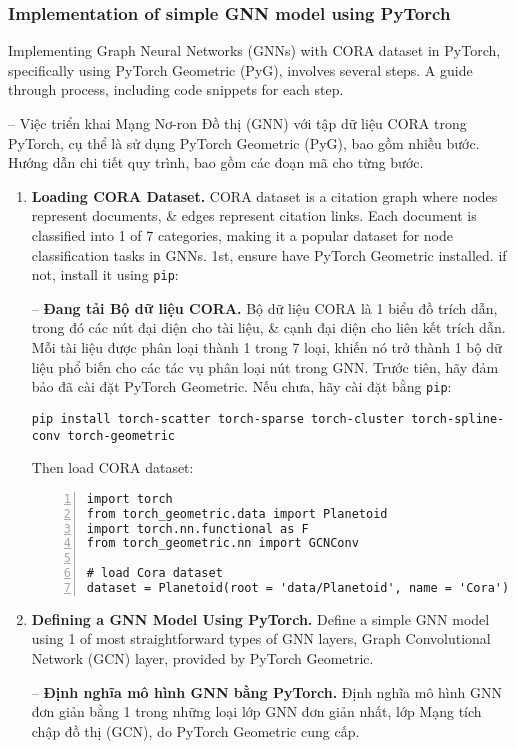 \documentclass{article}
\begin{document}

\subsubsection{Implementation of simple GNN model using PyTorch}
Implementing Graph Neural Networks (GNNs) with CORA dataset in PyTorch, specifically using PyTorch Geometric (PyG), involves several steps. A guide through process, including code snippets for each step.

-- Việc triển khai Mạng Nơ-ron Đồ thị (GNN) với tập dữ liệu CORA trong PyTorch, cụ thể là sử dụng PyTorch Geometric (PyG), bao gồm nhiều bước. Hướng dẫn chi tiết quy trình, bao gồm các đoạn mã cho từng bước.
\begin{enumerate}
    \item {\bf Loading CORA Dataset.} CORA dataset is a citation graph where nodes represent documents, \& edges represent citation links. Each document is classified into 1 of 7 categories, making it a popular dataset for node classification tasks in GNNs. 1st, ensure have PyTorch Geometric installed. if not, install it using {\tt pip}:

    -- {\bf Đang tải Bộ dữ liệu CORA.} Bộ dữ liệu CORA là 1 biểu đồ trích dẫn, trong đó các nút đại diện cho tài liệu, \& cạnh đại diện cho liên kết trích dẫn. Mỗi tài liệu được phân loại thành 1 trong 7 loại, khiến nó trở thành 1 bộ dữ liệu phổ biến cho các tác vụ phân loại nút trong GNN. Trước tiên, hãy đảm bảo đã cài đặt PyTorch Geometric. Nếu chưa, hãy cài đặt bằng {\tt pip}:
    \begin{verbatim}
pip install torch-scatter torch-sparse torch-cluster torch-spline-conv torch-geometric
    \end{verbatim}
    Then load CORA dataset:
    \begin{Verbatim}[numbers=left,xleftmargin=5mm]
import torch
from torch_geometric.data import Planetoid
import torch.nn.functional as F
from torch_geometric.nn import GCNConv

# load Cora dataset
dataset = Planetoid(root = 'data/Planetoid', name = 'Cora')
    \end{Verbatim}
    \item {\bf Defining a GNN Model Using PyTorch.} Define a simple GNN model using 1 of most straightforward types of GNN layers, Graph Convolutional Network (GCN) layer, provided by PyTorch Geometric.

    -- {\bf Định nghĩa mô hình GNN bằng PyTorch.} Định nghĩa mô hình GNN đơn giản bằng 1 trong những loại lớp GNN đơn giản nhất, lớp Mạng tích chập đồ thị (GCN), do PyTorch Geometric cung cấp.


\end{enumerate}
\end{document}
